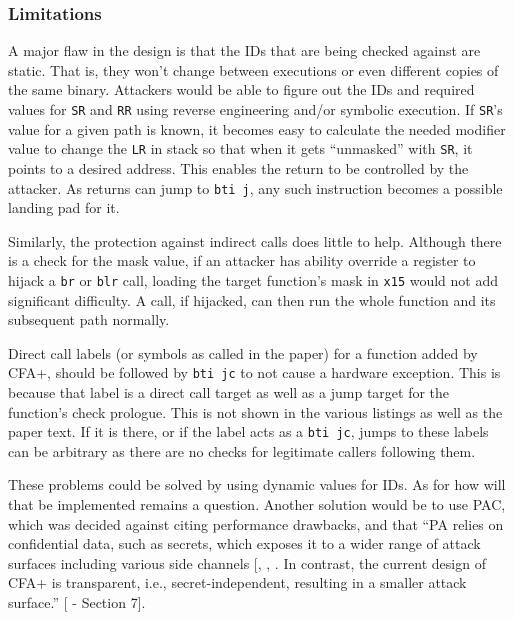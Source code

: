 \documentclass[a4paper, nobind]{templates/ociamthesis}
\begin{document}
\subsubsection{Limitations}\label{limitations-1}

A major flaw in the design is that the IDs that are being checked against are static.
That is, they won't change between executions or even different copies of the same binary.
Attackers would be able to figure out the IDs and required values for \texttt{SR} and \texttt{RR} using
reverse engineering and/or symbolic execution. If \texttt{SR}'s value for a given path
is known, it becomes easy to calculate the needed modifier value to change the
\texttt{LR} in stack so that when it gets ``unmasked'' with \texttt{SR}, it points to a desired address.
This enables the return to be controlled by the attacker. As returns can jump to \texttt{bti\ j},
any such instruction becomes a possible landing pad for it.

Similarly, the protection against indirect calls does little to help. Although
there is a check for the mask value, if an attacker has ability override a register to
hijack a \texttt{br} or \texttt{blr} call, loading the target function's mask in \texttt{x15} would not
add significant difficulty. A call, if hijacked, can then run the whole function
and its subsequent path normally.

Direct call labels (or symbols as called in the paper) for a function added by CFA+,
should be followed by \texttt{bti\ jc} to not cause a hardware exception.
This is because that label is a direct call target as well as a jump target for
the function's check prologue. This is not shown in the various listings as well as the paper text.
If it is there, or if the label acts as a \texttt{bti\ jc}, jumps to these labels can be
arbitrary as there are no checks for legitimate callers following them.

These problems could be solved by using dynamic values for IDs. As for how will that
be implemented remains a question. Another solution would be to use PAC, which
was decided against citing performance drawbacks, and that ``PA relies on confidential
data, such as secrets, which exposes it to a wider range of attack surfaces including
various side channels {[}, , \citeproc{ref-ravichandran2022pacman}{46}{]}.
In contrast, the current design of CFA+ is transparent, i.e.,
secret-independent, resulting in a smaller attack surface.'' {[} - Section 7{]}.
\end{document}
